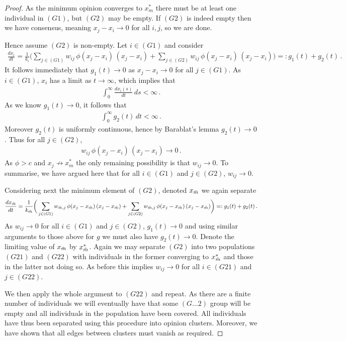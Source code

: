 \documentclass{article}
\begin{document}
\begin{proof}
    As the minimum opinion converges to $x_m^*$ there must be at least one individual in $(G1)$, but $(G2)$ may be empty. If $(G2)$ is indeed empty then we have consensus, meaning $x_j-x_i\rightarrow0$ for all $i,j$, so we are done. 
    
    Hence assume $(G2)$ is non-empty. Let $i\in(G1)$ and consider
    \begin{align*}
        \frac{dx_i}{dt} = \frac{1}{k_i} \bigg( \sum_{j\in(G1)} w_{ij}\,\phi(x_j - x_i)\,(x_j - x_i) + \sum_{j\in(G2)} w_{ij}\,\phi(x_j - x_i)\,(x_j - x_i) \bigg) =: g_1(t) + g_2(t)\,.
    \end{align*}
    It follows immediately that $g_1(t) \rightarrow 0$ as $x_j-x_i\rightarrow0$ for all $j\in(G1)$. As $i\in (G1)$, $x_i$ has a limit as $t\rightarrow\infty$, which implies that 
    \begin{align*}
        \int_0^\infty \frac{dx_i(s)}{dt} \, ds < \infty \,.
    \end{align*}
    As we know $g_1(t)\rightarrow0$, it follows that 
    \begin{align*}
        \int_0^\infty g_2(t) \, dt < \infty \,.
    \end{align*}
    Moreover $g_2(t)$ is uniformly continuous, hence by Barablat's lemma \cite{barbalat1959systemes} $g_2(t)\rightarrow0$. Thus for all $j\in(G2)$, 
    \begin{align*}
        w_{ij}\,\phi(x_j - x_i)\,(x_j - x_i) \rightarrow 0 \,.
    \end{align*}
    As $\phi > c$ and $x_j \nrightarrow x_m^*$ the only remaining possibility is that $w_{ij} \rightarrow 0$. To summarise, we have argued here that for all $i\in (G1)$ and $j \in (G2)$, $w_{ij} \rightarrow 0$. 
        
    Considering next the minimum element of $(G2)$, denoted $x_{\Tilde{m}}$ we again separate
    \begin{align*}
        \frac{dx_{\Tilde{m}}}{dt} = \frac{1}{k_{\Tilde{m}}} \bigg( \sum_{j\in(G1)} w_{\Tilde{m},j}\,\phi(x_j - x_{\Tilde{m}})\,(x_j - x_{\Tilde{m}}) + \sum_{j\in(G2)} w_{\Tilde{m},j}\,\phi(x_j - x_{\Tilde{m}})\,(x_j - x_{\Tilde{m}}) \bigg) =: g_1(t) + g_2(t)\,.
    \end{align*}
    As $w_{ij}\rightarrow0$ for all $i\in(G1)$ and $j\in(G2)$, $g_1(t)\rightarrow0$ and using similar arguments to those above for $g$ we must also have $g_2(t)\rightarrow0$. Denote the limiting value of $x_{\Tilde{m}}$ by $x_{\Tilde{m}}^*$. Again we may separate $(G2)$ into two populations $(G21)$ and $(G22)$ with individuals in the former converging to $x_{\Tilde{m}}^*$ and those in the latter not doing so. As before this implies $w_{ij}\rightarrow0$ for all $i\in(G21)$ and $j\in(G22)$. 

    We then apply the whole argument to $(G22)$ and repeat. As there are a finite number of individuals we will eventually have that some $(G\dots2)$ group will be empty and all individuals in the population have been covered. All individuals have thus been separated using this procedure into opinion clusters. Moreover, we have shown that all edges between clusters must vanish as required. 
\end{proof}
\end{document}
